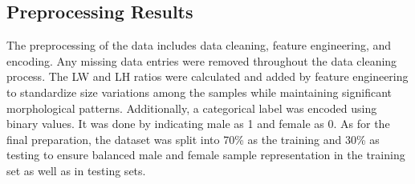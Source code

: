 \subsection{Preprocessing Results}

\begin{table}[H]
	\centering
	\caption{ Descriptive statistics of the T. granosa features}
	\label{tab:descriptive-stat}
\end{table}

The preprocessing of the data includes data cleaning, feature engineering, and encoding. Any missing data entries were removed throughout the data cleaning process. The LW and LH ratios were calculated and added by feature engineering to standardize size variations among the samples while maintaining significant morphological patterns. Additionally, a categorical label was encoded using binary values. It was done by indicating male as 1 and female as 0. As for the final preparation, the dataset was split into 70\% as the training and 30\% as testing to ensure balanced male and female sample representation in the training set as well as in testing sets.

